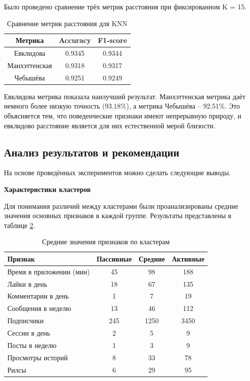 \documentclass[14pt, a4paper]{extarticle}
\begin{document}
Было проведено сравнение трёх метрик расстояния при фиксированном K = 15.

\begin{table}[h!]
\centering
\caption{Сравнение метрик расстояния для KNN}
\label{tab:metrics}
\begin{tabular}{|c|c|c|}
\hline
\textbf{Метрика} & \textbf{Accuracy} & \textbf{F1-score} \\
\hline
Евклидова & 0.9345 & 0.9344 \\
Манхэттенская & 0.9318 & 0.9317 \\
Чебышёва & 0.9251 & 0.9249 \\
\hline
\end{tabular}
\end{table}

Евклидова метрика показала наилучший результат. Манхэттенская метрика даёт немного более низкую точность (93.18\%), а метрика Чебышёва -- 92.51\%. Это объясняется тем, что поведенческие признаки имеют непрерывную природу, и евклидово расстояние является для них естественной мерой близости.

\subsection{Анализ результатов и рекомендации}

На основе проведённых экспериментов можно сделать следующие выводы.

\textbf{Характеристики кластеров}

Для понимания различий между кластерами были проанализированы средние значения основных признаков в каждой группе. Результаты представлены в таблице \ref{tab:cluster_means}.

\begin{table}[h!]
\centering
\caption{Средние значения признаков по кластерам}
\label{tab:cluster_means}
\begin{tabular}{|l|c|c|c|}
\hline
\textbf{Признак} & \textbf{Пассивные} & \textbf{Средние} & \textbf{Активные} \\
\hline
Время в приложении (мин) & 45 & 98 & 188 \\
Лайки в день & 18 & 67 & 135 \\
Комментарии в день & 1 & 7 & 19 \\
Сообщения в неделю & 13 & 46 & 112 \\
Подписчики & 245 & 1250 & 3450 \\
Сессии в день & 2 & 5 & 9 \\
Посты в неделю & 1 & 3 & 9 \\
Просмотры историй & 8 & 33 & 78 \\
Рилсы & 6 & 29 & 95 \\
\hline
\end{tabular}
\end{table}
\end{document}
